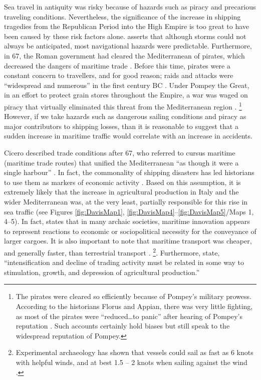 Sea travel in antiquity was risky because of hazards such as piracy and precarious traveling conditions. Nevertheless, the significance of the increase in shipping tragedies from the Republican Period into the High Empire is too great to have been caused by these risk factors alone. \textcite[3304]{Leidwanger_2013} asserts that although storms could not always be anticipated, most navigational hazards were predictable. Furthermore, in 67\BC, the Roman government had cleared the Mediterranean of pirates, which decreased the dangers of maritime trade \parencites[313]{Kessler_2007}[287]{Wilson_2012}. Before this time, pirates were a constant concern to travellers, and for good reason; raids and attacks were “widespread and numerous” in the first century BC \parencite[165]{Souza_1999}. Under Pompey the Great, in an effort to protect grain stores throughout the Empire, a war was waged on piracy that virtually eliminated this threat from the Mediterranean region \parencites[226]{Adams_2012}{Souza_1999}.
\footnote{The pirates were cleared so efficiently because of Pompey’s military prowess. According to the historians Florus and Appian, there was very little fighting, as most of the pirates were “reduced…to panic” after hearing of Pompey’s reputation \parencite[169]{Souza_1999}. Such accounts certainly hold biases but still speak to the widespread reputation of Pompey.}  However, if we take hazards such as dangerous sailing conditions and piracy as major contributors to shipping losses, than it is reasonable to suggest that a sudden increase in maritime traffic would correlate with an increase in accidents. 

Cicero described trade conditions after 67\BC, who referred to cursus maritime (maritime trade routes) that unified the Mediterranean “as though it were a single harbour” \parencite[255]{Adams_2012}.  In fact, the commonality of shipping disasters has led historians to use them as markers of economic activity \parencite[317]{Kessler_2007}. Based on this assumption, it is extremely likely that the increase in agricultural production in Italy and the wider Mediterranean was, at the very least, partially responsible for this rise in sea traffic (see Figures \ref{fig:DavisMap1}, \ref{fig:DavisMap4}--\ref{fig:DavisMap5}/Maps 1, 4--5). In fact, \textcite{Leidwanger_2014} states that in many archaic societies, maritime innovation appears to represent reactions to economic or sociopolitical necessity for the conveyance of larger cargoes. It is also important to note that maritime transport was cheaper, and generally faster, than terrestrial transport \parencite[222]{Adams_2012}.
\footnote{Experimental archaeology has shown that vessels could sail as fast as 6 knots with helpful winds, and at best 1.5 – 2 knots when sailing against the wind \parencite[3305]{Leidwanger_2013}.}. Furthermore, \textcite[7]{Bowman_2013} state, “intensification and decline of trading activity must be related in some way to stimulation, growth, and depression of agricultural production.”

